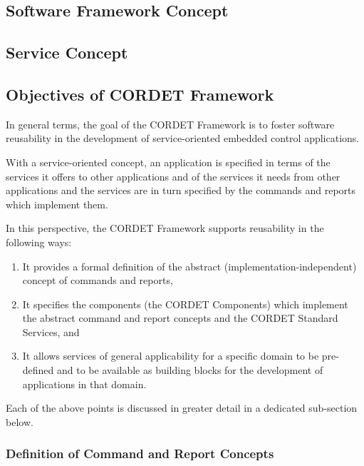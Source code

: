 \documentclass{pnp_article}
\begin{document}
\subsection{Software Framework Concept}\label{sec:SwFwConcept} 


\subsection{Service Concept}\label{sec:ServConcept} 

\subsection{Objectives of CORDET Framework}\label{sec:ObjectivesOfCrFw} 

In general terms, the goal of the CORDET Framework is to foster software reusability in the development of service-oriented embedded control applications. 

With a service-oriented concept, an application is specified in terms of the services it offers to other applications and of the services it needs from other applications and the services are in turn specified by the commands and reports which implement them.

In this perspective, the CORDET Framework supports reusability in the following ways:

\begin{enumerate}
\item{} It provides a formal definition of the abstract (implementation-independent) concept of commands and reports,
\item{} It specifies the components (the CORDET Components) which implement the abstract command and report concepts and the CORDET Standard Services, and
\item{} It allows services of general applicability for a specific domain to be pre-defined and to be available as building blocks for the development of applications in that domain.
\end{enumerate}

Each of the above points is discussed in greater detail in a dedicated sub-section below. 

\subsubsection{Definition of Command and Report Concepts}\label{sec:DefCmdRepConcepts}
\end{document}
